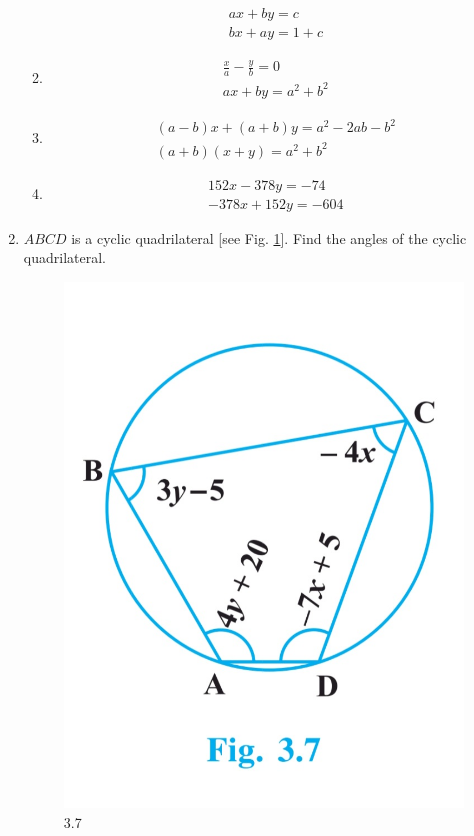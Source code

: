 \documentclass{article}
\theoremstyle{remark}
\begin{document}
\begin{enumerate}
\begin{enumerate}
\begin{align}
ax+by=c\\ bx+ay=1+c
\end{align}
\item 
\begin{align}
\frac {x}{a}-\frac{y}{b}=0\\ ax+by=a^2+b^2
\end{align}
\item
\begin{align}
(a-b)x+(a+b)y=a^2-2ab-b^2\\ (a+b)(x+y)=a^2+b^2
\end{align}
\item
\begin{align}
152x-378y=-74\\ -378x+152y=-604
\end{align}
\end{enumerate}
\item $ABCD$ is a cyclic quadrilateral [see Fig. \ref{fig:3.7}]. Find the angles of the cyclic quadrilateral.
\begin{figure}[ht]
\centering
\includegraphics[width=\columnwidth]{figs/3.7.png}
\caption{3.7}
  \label{fig:3.7}
\end{figure}
\end{enumerate}
\end{document}
